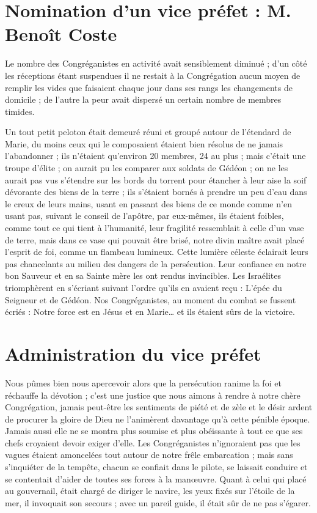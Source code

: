 \section*{Nomination d'un vice préfet : M. Benoît Coste}
Le nombre des Congréganistes en activité avait sensiblement diminué ; d'un côté les réceptions étant suspendues il ne restait à la Congrégation aucun moyen de remplir les vides que faisaient chaque jour dans ses rangs les changements de domicile ; de l'autre la peur avait dispersé un certain nombre de membres timides.

Un tout petit peloton était demeuré réuni et groupé autour de l'étendard de Marie, du moins ceux qui le composaient étaient bien résolus de ne jamais l'abandonner ; ils n'étaient qu'environ 20 membres, 24 au plus ; mais c'était une troupe d'élite ; on aurait pu les comparer aux soldats de Gédéon ; on ne les aurait pas vus s'étendre sur les bords du torrent pour étancher à leur aise la soif dévorante des biens de la terre ; ils s'étaient bornés à prendre un peu d'eau dans le creux de leurs mains, usant en passant des biens de ce monde comme n'en usant pas, suivant le conseil de l'apôtre, par eux-mêmes, ils étaient foibles, comme tout ce qui tient à l'humanité, leur fragilité ressemblait à celle d'un vase de terre, mais dans ce vase qui pouvait être brisé, notre divin maître avait
placé l'esprit de foi, comme un flambeau lumineux. Cette lumière céleste éclairait leurs pas chancelants au milieu des dangers de la persécution. Leur confiance en notre bon Sauveur et en sa Sainte mère les ont rendus invincibles. Les Israélites triomphèrent en s'écriant suivant l'ordre qu'ils en avaient reçu : L'épée du Seigneur et de Gédéon. Nos Congréganistes, au moment du combat se fussent écriés : Notre force est en Jésus et en Marie… et ils étaient sûrs de la victoire.

\section*{Administration du vice préfet}
Nous pûmes bien nous apercevoir alors que la persécution ranime la foi et réchauffe la dévotion ; c'est une justice que nous aimons à rendre à notre chère Congrégation, jamais peut-être les sentiments de piété et de zèle et le désir ardent de procurer la gloire de Dieu ne l'animèrent davantage qu'à cette pénible époque. Jamais aussi elle ne se montra plus soumise et plus obéissante à tout ce que ses chefs croyaient devoir exiger d'elle. Les Congréganistes n'ignoraient pas que les vagues étaient amoncelées tout autour de notre frêle embarcation ; mais sans s'inquiéter de la tempête, chacun se confiait dans le pilote, se laissait conduire et se contentait d'aider de toutes ses forces à la manœuvre. Quant à celui qui placé au gouvernail, était chargé de diriger le navire, les yeux fixés sur l'étoile de la mer, il invoquait son secours ; avec un pareil guide, il était sûr de ne pas s'égarer.


